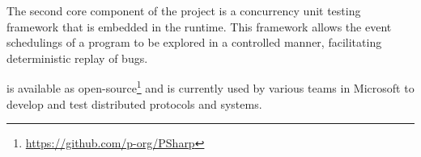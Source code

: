 The second core component of the \psharp project is a concurrency unit testing framework that is embedded in the \psharp runtime. This framework allows the event schedulings of a \psharp program to be explored in a controlled manner, facilitating deterministic replay of bugs.

\psharp is available as open-source\footnote{\url{https://github.com/p-org/PSharp}} and is currently used by various teams in Microsoft to develop and test distributed protocols and systems.

